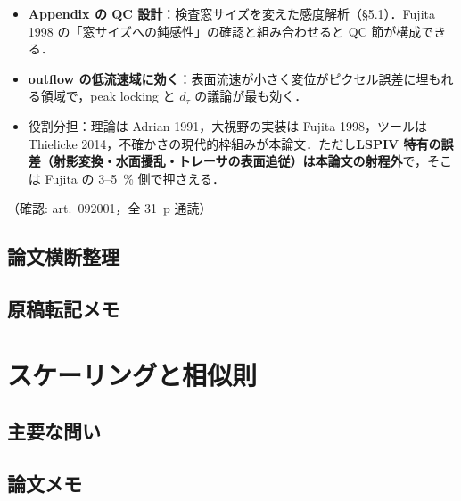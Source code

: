 \documentclass[11pt]{jsarticle}
\let\litsectionorig\section
\renewcommand{\section}{\clearpage\litsectionorig}
\begin{document}
\begin{itemize}
\begin{itemize}
    \item \textbf{Appendix の QC 設計}：検査窓サイズを変えた感度解析（§5.1）．Fujita 1998 の「窓サイズへの鈍感性」の確認と組み合わせると QC 節が構成できる．
    \item \textbf{outflow の低流速域に効く}：表面流速が小さく変位がピクセル誤差に埋もれる領域で，peak locking と $d_\tau$ の議論が最も効く．
    \item 役割分担：理論は Adrian 1991，大視野の実装は Fujita 1998，ツールは Thielicke 2014，不確かさの現代的枠組みが本論文．ただし\textbf{LSPIV 特有の誤差（射影変換・水面擾乱・トレーサの表面追従）は本論文の射程外}で，そこは Fujita の 3--5~\% 側で押さえる．
  \end{itemize}
\end{itemize}
\noindent（確認: art.\ 092001，全 31~p 通読）

\subsection*{論文横断整理}

\subsection*{原稿転記メモ}

\section{スケーリングと相似則}

\subsection*{主要な問い}

\subsection*{論文メモ}
\end{document}
